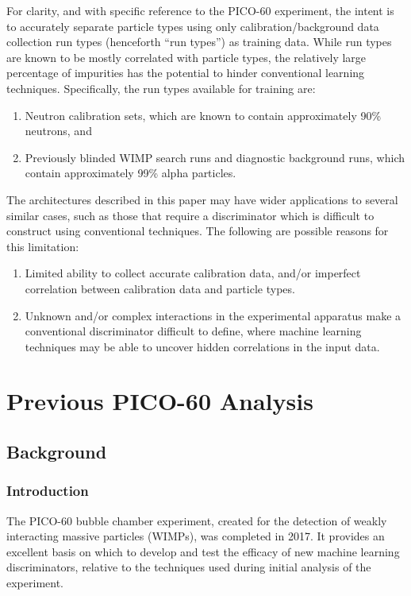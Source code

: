 \documentclass[10pt]{article}
\begin{document}
For clarity, and with specific reference to the PICO-60 experiment, the intent is to accurately separate particle types using only calibration/background data collection run types (henceforth ``run types'') as training data. While run types are known to be mostly correlated with particle types, the relatively large percentage of impurities has the potential to hinder conventional learning techniques. Specifically, the run types available for training are:

\begin{enumerate}
    \item Neutron calibration sets, which are known to contain approximately 90\% neutrons, and
    \item Previously blinded WIMP search runs and diagnostic background runs, which contain approximately 99\% alpha particles.
\end{enumerate}

The architectures described in this paper may have wider applications to several similar cases, such as those that require a discriminator which is difficult to construct using conventional techniques. The following are possible reasons for this limitation:

\begin{enumerate}
    \item Limited ability to collect accurate calibration data, and/or imperfect correlation between calibration data and particle types.
    \item Unknown and/or complex interactions in the experimental apparatus make a conventional discriminator difficult to define, where machine learning techniques may be able to uncover hidden correlations in the input data.
\end{enumerate}

\section{Previous PICO-60 Analysis}

\subsection{Background}

\subsubsection{Introduction}

The PICO-60 \cite{pico} bubble chamber experiment, created for the detection of weakly interacting massive particles (WIMPs), was completed in 2017. It provides an excellent basis on which to develop and test the efficacy of new machine learning discriminators, relative to the techniques used during initial analysis of the experiment.
\end{document}
